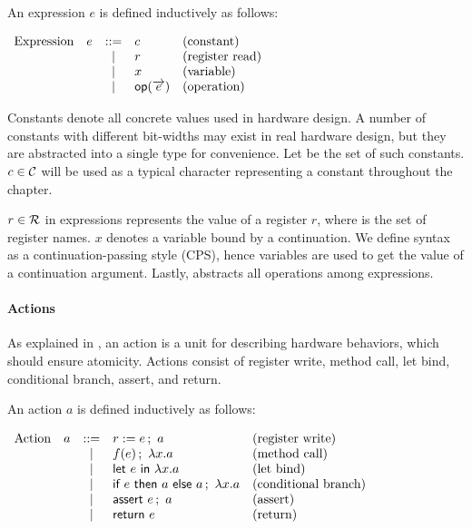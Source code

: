 \begin{definition}
  \label{def-expression}
  An expression $e$ is defined inductively as follows:
  \begin{center}
    \begin{math}
      \begin{array}{rcll}
        \textrm{Expression}\quad e & ::= & c & \textrm{(constant)} \\
        & | & r & \textrm{(register read)} \\
        & | & x & \textrm{(variable)} \\
        & | & \eop{e} & \textrm{(operation)} \\
      \end{array}
    \end{math}
  \end{center}
\end{definition}

Constants denote all concrete values used in hardware design. A number
of constants with different bit-widths may exist in real hardware
design, but they are abstracted into a single type for
convenience. Let \setconst{} be the set of such constants. $c \in
\setconst{}$ will be used as a typical character representing a
constant throughout the chapter.

$r \in \setregs{}$ in expressions represents the value of a register
$r$, where \setregs{} is the set of register names. $x$ denotes a
variable bound by a continuation. We define syntax as a
continuation-passing style (CPS), hence variables are used to get the
value of a continuation argument. Lastly,  abstracts all
operations among expressions.

\paragraph{Actions}
As explained in , an action is a unit for
describing hardware behaviors, which should ensure atomicity. Actions
consist of register write, method call, let bind, conditional branch,
assert, and return.

\begin{definition}
  \label{def-action}
  An action $a$ is defined inductively as follows:
  \begin{center}
    \begin{math}
      \begin{array}{rcll}
        \textrm{Action}\quad a & ::= & \actwrite{r}{e}{a} & \textrm{(register write)} \\
        & | & \actcall{x}{f}{e}{a} & \textrm{(method call)} \\
        & | & \actlet{e}{x}{a} & \textrm{(let bind)} \\
        & | & \actifelse{e}{a}{a}{x}{a} & \textrm{(conditional branch)} \\
        & | & \actassert{e}{a} & \textrm{(assert)} \\
        & | & \actret{e} & \textrm{(return)} \\
      \end{array}
    \end{math}
  \end{center}
\end{definition}

